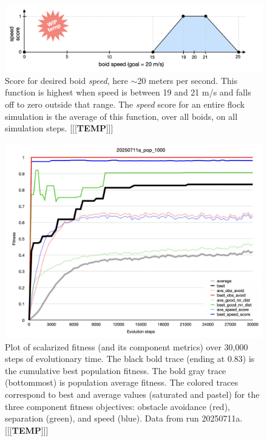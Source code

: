 \documentclass[letterpaper]{article}
\begin{document}

\begin{figure}[t]
    \centering
    \includegraphics[width=0.9\linewidth]{images/temp_speed_score.png}
    \caption{Score for desired boid \textit{speed}, here $\sim$20 meters per second. This function is highest when speed is between 19 and 21 m/s and falls off to zero outside that range. The \textit{speed} score for an entire flock simulation is the average of this function, over all boids, on all simulation steps. [[[\textbf{TEMP}]]]}
    \label{fig:speed_score}
\end{figure}



\begin{figure}[t]
    \centering
    \includegraphics[width=\linewidth]{images/temp_fit_plot.png}
    \caption{Plot of scalarized fitness (and its component metrics) over 30,000 steps of evolutionary time. The black bold trace (ending at 0.83) is the cumulative best population fitness. The bold gray trace (bottommost) is population average fitness. The colored traces correspond to best and average values (saturated and pastel) for the three component fitness objectives: obstacle avoidance (red), separation (green), and speed (blue). Data from run 20250711a. [[[\textbf{TEMP}]]]}
    \label{fig:fit_plot}
\end{figure}
\end{document}
